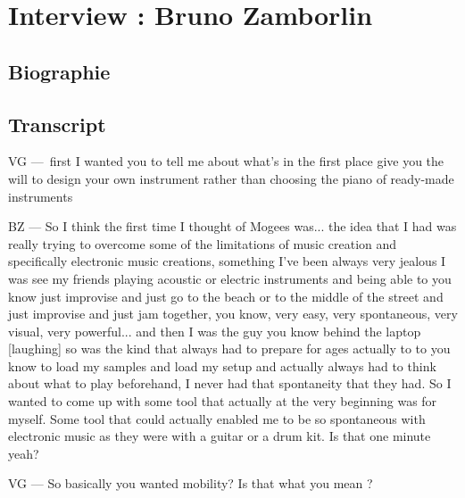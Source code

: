 \chapter{Interview : Bruno Zamborlin}
\label{appendix:zamborlin}

\section*{Biographie}


\section*{Transcript}


VG — first I wanted you to tell me about what's in the first place give you the will to design your own instrument rather than choosing the piano of ready-made instruments 

BZ — So I think the first time I thought of Mogees was... the idea that I had was really trying to overcome some of the limitations of music creation and specifically electronic music creations, something I've been always very jealous I was see my friends playing acoustic or electric instruments and being able to you know just improvise and just go to the beach or to the middle of the street and just improvise and just jam together, you know, very easy, very spontaneous, very visual, very powerful... and then I was the guy you know behind the laptop [laughing] so was the kind that always had to prepare for ages actually to to you know to load my samples and load my setup and actually always had to think about what to play beforehand, I never had that spontaneity that they had. So I wanted to come up with some tool that actually at the very beginning was for myself. Some tool that could actually enabled me to be so spontaneous with electronic music as they were with a guitar or a drum kit. Is that one minute yeah? 

VG — So basically you wanted mobility? Is that what you mean ?

